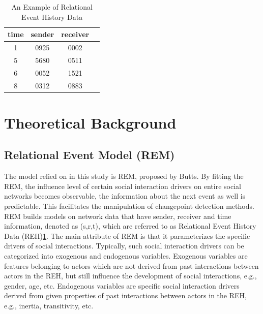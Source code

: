 \documentclass[]{interact}
\theoremstyle{plain}%
\theoremstyle{definition}
\theoremstyle{remark}
\begin{document}
\begin{table}[h]
	\centering
	\begin{tabular}{cccc}
		\hline
		time & sender & receiver \\ \hline
		1 & 0925 & 0002 \\
		5 & 5680 & 0511 \\
		6 & 0052 & 1521 \\
		8 & 0312 & 0883 \\ \hline
	\end{tabular}
	\caption{An Example of Relational Event History Data}
	\label{Table 1}
\end{table}


\section{\fontsize{14}{15}\selectfont Theoretical Background}

\subsection{Relational Event Model (REM)}

\hspace{0.2cm} The model relied on in this study is REM, proposed by Butts\cite{buttsRelationalEventFramework2008}. By fitting the REM, the influence level of certain social interaction drivers on entire social networks becomes observable, the information about the next event as well is predictable. This facilitates the manipulation of changepoint detection methods.\\ 

REM builds models on network data that have sender, receiver and time information, denoted as (s,r,t), which are referred to as Relational Event History Data (REH)\ref{Table 1}. The main attribute of REM is that it parameterizes the specific drivers of social interactions. Typically, such social interaction drivers can be categorized into exogenous and endogenous variables. Exogenous variables are features belonging to actors which are not derived from past interactions between actors in the REH, but still influence the development of social interactions, e.g., gender, age, etc. Endogenous variables are specific social interaction drivers derived from given properties of past interactions between actors in the REH, e.g., inertia, transitivity, etc.\\
\end{document}
